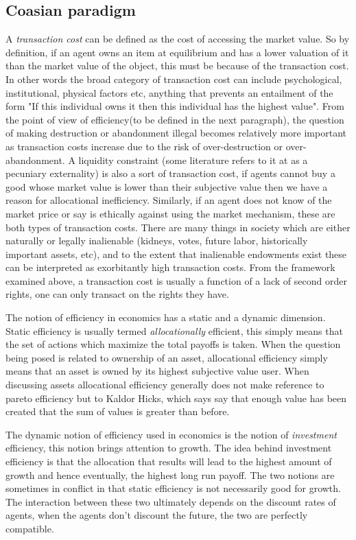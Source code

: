 \documentclass[12pt]{article}
\numberwithin{equation}{section}
\begin{document}
\subsection{Coasian paradigm}

A \textit{transaction cost} can be defined as the cost of accessing the market value. So by definition, if an agent owns an item at equilibrium and has a lower valuation of it than the market value of the object, this must be because of the transaction cost. In other words the broad category of transaction cost can include psychological, institutional, physical factors etc, anything that prevents an entailment of the form "If this individual owns it then this individual has the highest value". From the point of view of efficiency(to be defined in the next paragraph), the question of making destruction or abandonment illegal becomes relatively more important as transaction costs increase due to the risk of over-destruction or over-abandonment. A liquidity constraint (some literature refers to it at as a pecuniary externality) is also a sort of transaction cost, if agents cannot buy a good whose market value is lower than their subjective value then we have a reason for allocational inefficiency. Similarly, if an agent does not know of the market price or say is ethically against using the market mechanism, these are both types of transaction costs. There are many things in society which are either naturally or legally inalienable (kidneys, votes, future labor, historically important assets, etc), and to the extent that inalienable endowments exist these can be interpreted as exorbitantly high transaction costs. From the framework examined above, a transaction cost is usually a function of a lack of second order rights, one can only transact on the rights they have.

The notion of efficiency in economics has a static and a dynamic dimension. Static efficiency is usually termed \textit{allocationally} efficient, this simply means that the set of actions which maximize the total payoffs is taken. When the question being posed is related to ownership of an asset, allocational efficiency simply means that an asset is owned by its highest subjective value user. When discussing assets allocational efficiency generally does not make reference to pareto efficiency but to Kaldor Hicks, which says say that enough value has been created that the sum of values is greater than before.

The dynamic notion of efficiency used in economics is the notion of \textit{investment} efficiency, this notion brings attention to growth. The idea behind investment efficiency is that the allocation that results will lead to the highest amount of growth and hence eventually, the highest long run payoff. The two notions are sometimes in conflict in that static efficiency is not necessarily good for growth. The interaction between these two ultimately depends on the discount rates of agents, when the agents don't discount the future, the two are perfectly compatible.
\end{document}
